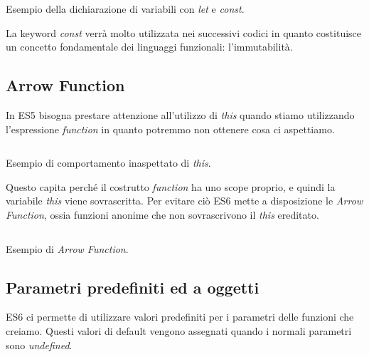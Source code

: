 \begin{listing}[ht]
\inputminted{Javascript}{sources/exampleLetConstES6.js}
\caption{Esempio della dichiarazione di variabili con \textit{let} e \textit{const}.}
\end{listing}

\noindent
La keyword \textit{const} verrà molto utilizzata nei successivi codici in quanto costituisce un concetto fondamentale dei linguaggi funzionali: l'immutabilità\footnotemark.

\subsection{Arrow Function}
In ES5 bisogna prestare attenzione all'utilizzo di \textit{this} quando stiamo utilizzando l'espressione \textit{function} in quanto potremmo non ottenere cosa ci aspettiamo.

\begin{listing}[ht]
\inputminted{Javascript}{sources/exampleShadowThisES5.js}
\caption{Esempio di comportamento inaspettato di \textit{this}.}
\end{listing}

\noindent
Questo capita perché il costrutto \textit{function} ha uno scope proprio, e quindi la variabile \textit{this} viene sovrascritta. Per evitare ciò ES6 mette a disposizione le \textit{Arrow Function}, ossia funzioni anonime che non sovrascrivono il \textit{this} ereditato.

\begin{listing}[ht]
\inputminted{Javascript}{sources/exampleArrowFunctionES6.js}
\caption{Esempio di \textit{Arrow Function}.}
\end{listing} 


\subsection{Parametri predefiniti ed a oggetti}
ES6 ci permette di utilizzare valori predefiniti per i parametri delle funzioni che creiamo. Questi valori di default vengono assegnati quando i normali parametri sono \textit{undefined}. 

